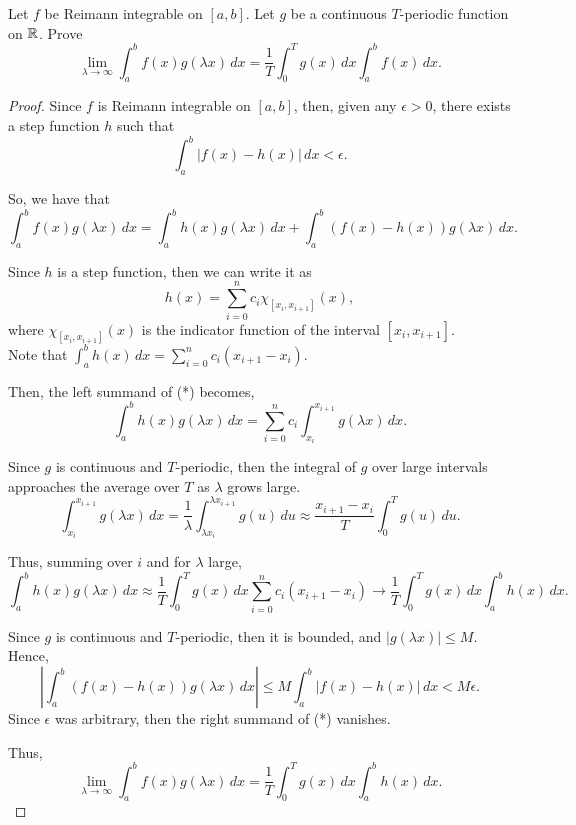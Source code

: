 \documentclass[../hw5]{subfiles}
\begin{document}
\begin{problem}
Let $f$ be Reimann integrable on  $[a,b]$.
Let $g$ be a continuous  $T$-periodic function on  $\mathbb{R}$.
Prove \[
	\lim_{\lambda \to \infty} \int_{a}^{b} f(x)g(\lambda x) \,dx = \frac{1}{T}\int_{0}^{T}g(x)\,dx \int_{a}^{b} f(x) \,dx
	.\]
\end{problem}
\begin{proof}
	Since $f$ is Reimann integrable on $[a,b]$, then, given any  $\epsilon>0$, there exists a step function $h$ such that \[
		\int_{a}^{b} |f(x)-h(x)| \,dx < \epsilon
		.\]

	So, we have that \[
		\int_{a}^{b} f(x)g(\lambda x) \,dx = \int_{a}^{b} h(x)g(\lambda x) \,dx + \int_{a}^{b} (f(x)-h(x))g(\lambda x) \,dx \tag{*}
		.\]

	Since $h$ is a step function, then we can write it as \[
		h(x)=\sum_{i=0}^{n} c_i \chi_{[x_i,x_{i+1}]}(x)
		,\] where $ \chi_{[x_i,x_{i+1}]}(x)$ is the indicator function of the interval $[x_i,x_{i+1}]$.\\
	Note that $\int_{a}^{b} h(x) \,dx = \sum_{i=0}^{n} c_i (x_{i+1}-x_i)$.

	Then, the left summand of (*) becomes, \[
		\int_{a}^{b} h(x)g(\lambda x) \,dx = \sum_{i=0 }^{n} c_i \int_{x_i }^{x_{i+1}}g(\lambda x) \,dx
		.\]

	Since $g$ is continuous and $T$-periodic, then the integral of $g$ over large intervals approaches the average over $T$ as $\lambda$ grows large.
	\[
		\int_{x_i}^{x_{i+1}} g(\lambda x) \,dx
		= \frac{1}{\lambda}\int_{\lambda x_i}^{\lambda x_{i+1}} g(u) \,du
		\approx \frac{x_{i+1}-x_i}{T}\int_{0}^{T} g(u) \,du
		.\]

	Thus, summing over $i$ and for $\lambda$ large, \[
		\int_{a}^{b} h(x)g(\lambda x) \,dx
		\approx \frac{1}{T} \int_{0}^{T} g(x) \,dx \sum_{i=0}^{n} c_i (x_{i+1}-x_i)
		\to \frac{1}{T} \int_{0}^{T} g(x) \,dx \int_{a}^{b} h(x) \,dx
		.\]

	Since $g$ is continuous and $T$-periodic, then it is bounded, and $|g(\lambda x)|\le M$.
	Hence, \[
		\left| \int_{a}^{b} (f(x)-h(x))g(\lambda x) \,dx \right| \le M \int_{a}^{b} |f(x)-h(x)| \,dx < M\epsilon
		.\] Since $\epsilon$ was arbitrary, then the right summand of (*) vanishes.

	Thus, \[
		\lim_{\lambda \to \infty} \int_{a}^{b} f(x)g(\lambda x) \,dx
		= \frac{1}{T} \int_{0}^{T} g(x) \,dx \int_{a}^{b} h(x) \,dx
		.\]
\end{proof}
\end{document}
